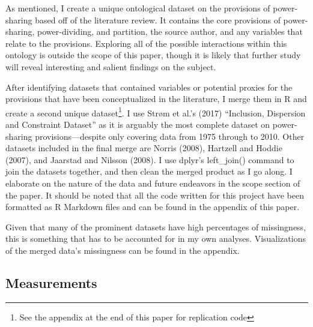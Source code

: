\documentclass[12pt]{article}
\begin{document}
As mentioned, I create a unique ontological dataset on the provisions of power-sharing based off of the literature review. It contains the core provisions of power-sharing, power-dividing, and partition, the source author, and any variables that relate to the provisions. Exploring all of the possible interactions within this ontology is outside the scope of this paper, though it is likely that further study will reveal interesting and salient findings on the subject. 

After identifying datasets that contained variables or potential proxies for the provisions that have been conceptualized in the literature, I merge them in R and create a second unique dataset\footnote{See the appendix at the end of this paper for replication code}. I use Strøm et al.’s (2017) “Inclusion, Dispersion and Constraint Dataset” as it is arguably the most complete dataset on power-sharing provisions—despite only covering data from 1975 through to 2010. Other datasets included in the final merge are Norris (2008), Hartzell and Hoddie (2007), and Jaarstad and Nilsson (2008). I use dplyr’s left\_join() command to join the datasets together, and then clean the merged product as I go along. I elaborate on the nature of the data and future endeavors in the scope section of the paper. It should be noted that all the code written for this project have been formatted as R Markdown files and can be found in the appendix of this paper. 

Given that many of the prominent datasets have high percentages of missingness, this is something that has to be accounted for in my own analyses. Visualizations of the merged data’s missingness can be found in the appendix. 

\subsection{Measurements}
\end{document}
